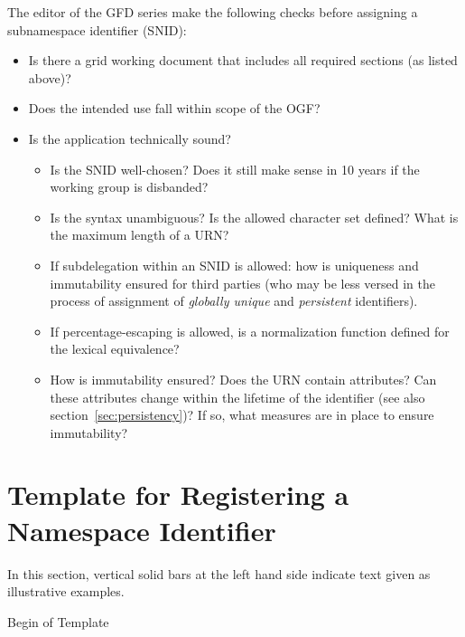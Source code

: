 \documentclass[12pt]{article}  %
\begin{document}
The editor of the GFD series \SHOULD{} make the following checks before assigning 
a subnamespace identifier (SNID):
\begin{itemize}
    \item Is there a grid working document that includes all required sections (as listed above)?
    \item Does the intended use fall within scope of the OGF?
    \item Is the application technically sound?
    \begin{itemize}
        \item Is the SNID well-chosen? Does it still make sense in 10 years if the 
          working group is disbanded?
        \item Is the syntax unambiguous? Is the allowed character set defined? 
          What is the maximum length of a URN?
        \item If subdelegation within an SNID is allowed: how is uniqueness and immutability ensured 
          for third parties (who may be less versed in the process of assignment of 
          \emph{globally unique} and \emph{persistent} identifiers).
        \item If percentage-escaping is allowed, is a normalization function defined for the 
          lexical equivalence?
        \item How is immutability ensured? Does the URN contain attributes? Can these 
          attributes change within the lifetime of the identifier (see also 
          section~\ref{sec:persistency})? If so, what measures are in place to ensure 
          immutability?
    \end{itemize}
\end{itemize}

\section{Template for Registering a Namespace Identifier}%
\label{sec:template}

\newenvironment{example}[1][]
{
\begin{leftbar}\begin{sloppypar}\noindent
    Example{#1}:
}{
\end{sloppypar}\end{leftbar}
}

In this section, vertical solid bars at the left hand side indicate text given as 
illustrative examples.

\hrulefill\hspace{1ex} \textsf{Begin of Template} \hspace{1ex}\hrulefill
\end{document}

